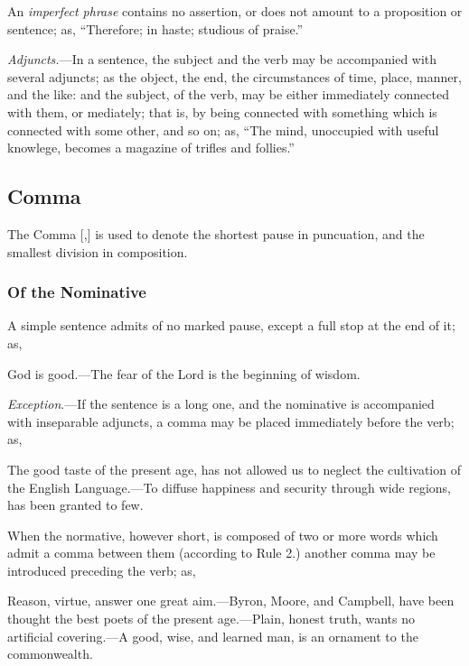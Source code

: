 An \emph{imperfect phrase} contains no assertion, or does not amount to a
proposition or sentence; as, ``Therefore; in haste; studious of praise.''

\emph{Adjuncts.}---In a sentence, the subject and the verb may be accompanied
with several adjuncts; as the object, the end, the circumstances of time, place,
manner, and the like: and the subject, of the verb, may be either immediately
connected with them, or mediately; that is, by being connected with something
which is connected with some other, and so on; as, ``The mind, unoccupied with
useful knowlege, becomes a magazine of trifles and follies.''
\normalsize

\subsection{Comma}

The Comma [,] is used to denote the shortest pause in puncuation, and the
smallest division in composition.

\subsubsection{Of the Nominative}

A simple sentence admits of no marked pause, except a full stop at the end of
it; as,

\begin{example}
God is good.---The fear of the Lord is the beginning of wisdom.
\end{example}

\emph{Exception}.---If the sentence is a long one, and the nominative is
accompanied with inseparable adjuncts, a comma may be placed immediately before
the verb; as,

\begin{example}
The good taste of the present age, has not allowed us to neglect the cultivation
of the English Language.---To diffuse happiness and security through wide
regions, has been granted to few.
\end{example}

When the normative, however short, is composed of two or more words which admit
a comma between them (according to Rule 2.) another comma may be introduced
preceding the verb; as,

\begin{example}
Reason, virtue, answer one great aim.---Byron, Moore, and Campbell, have been
thought the best poets of the present age.---Plain, honest truth, wants no
artificial covering.---A good, wise, and learned man, is an ornament to the
commonwealth.
\end{example}

